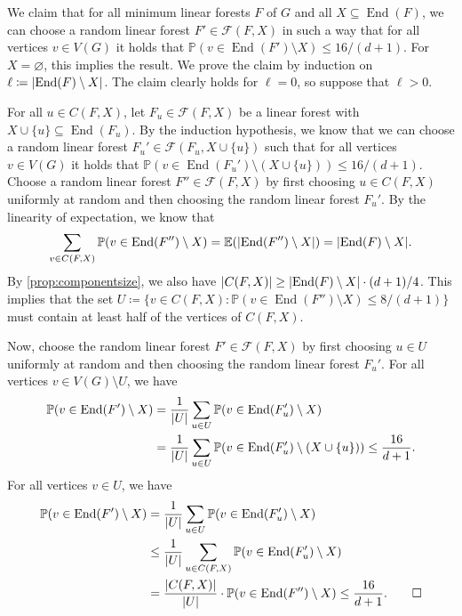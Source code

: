 \documentclass[11pt]{article}
\makeatletter
\theoremstyle{plain}
\theoremstyle{definition}
\renewenvironment{proof}[1][\proofname]
{\par\pushQED{\qed}
	\normalfont\topsep6\p@\@plus6\p@\relax\trivlist
	\item[\hskip\labelsep\bfseries#1\@addpunct{.}]
	\ignorespaces}
{\popQED\endtrivlist\@endpefalse}
\let\emptyset\varnothing
\newcommand{\pr}{\mathbb{P}}
\newcommand{\ev}{\mathbb{E}}
\newcommand{\cF}{\mathcal F}
\DeclarePairedDelimiter{\abs}{\lvert}{\rvert}
\DeclareMathOperator{\End}{End}
\makeatother
\begin{document}
\begin{proof}
    We claim that for all minimum linear forests $F$ of $G$ and all $X \subseteq \End(F)$, we can choose a random linear forest $F' \in \cF(F,X)$ in such a way that for all vertices $v \in V(G)$ it holds that $\pr(v \in \End(F') \setminus X) \le 16/(d+1)$. For $X = \emptyset$, this implies the result. We prove the claim by induction on $\ell \coloneqq \abs{\End(F) \setminus X}$. The claim clearly holds for $\ell = 0$, so suppose that $\ell > 0$.

    For all $u \in C(F,X)$, let $F_u \in \cF(F,X)$ be a linear forest with $X \cup \{u\} \subseteq \End(F_u)$. By the induction hypothesis, we know that we can choose a random linear forest $F_u' \in \cF(F_u,X \cup \{u\})$ such that for all vertices $v \in V(G)$ it holds that $\pr(v \in \End(F_u') \setminus (X \cup \{u\})) \le 16/(d+1)$. Choose a random linear forest $F'' \in \cF(F,X)$ by first choosing $u \in C(F,X)$ uniformly at random and then choosing the random linear forest $F_u'$. By the linearity of expectation, we know that
    \[
        \sum_{v \in C(F,X)} \pr(v \in \End(F'') \setminus X) = \ev(\abs{\End(F'') \setminus X}) = \abs{\End(F) \setminus X}.
    \]
    By \cref{prop:componentsize}, we also have $\abs{C(F,X)} \ge \abs{\End(F) \setminus X} \cdot (d+1)/4$. This implies that the set $U \coloneqq \{v \in C(F,X) : \pr(v \in \End(F'') \setminus X) \le 8/(d+1)\}$ must contain at least half of the vertices of $C(F,X)$.

    Now, choose the random linear forest $F' \in \cF(F,X)$ by first choosing $u \in U$ uniformly at random and then choosing the random linear forest $F_u'$. For all vertices $v \in V(G) \setminus U$, we have
    \begin{align*}
        \pr(v \in \End(F') \setminus X) & = \frac{1}{\abs{U}} \sum_{u \in U} \pr(v \in \End(F_u') \setminus X) \\
        & = \frac{1}{\abs{U}} \sum_{u \in U} \pr(v \in \End(F_u') \setminus (X \cup \{u\})) \le \frac{16}{d+1}.
    \end{align*}
    For all vertices $v \in U$, we have
    \begin{align*}
        \pr(v \in \End(F') \setminus X) & = \frac{1}{\abs{U}} \sum_{u \in U} \pr(v \in \End(F_u') \setminus X) \\
        & \le \frac{1}{\abs{U}} \sum_{u \in C(F,X)} \pr(v \in \End(F_u') \setminus X) \\
        & = \frac{\abs{C(F,X)}}{\abs{U}} \cdot \pr(v \in \End(F'') \setminus X) \le \frac{16}{d+1}. \qedhere
    \end{align*}
\end{proof}
\end{document}
